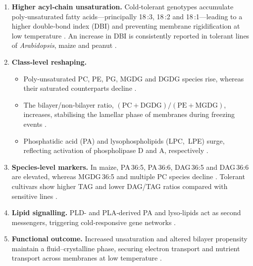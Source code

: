 \documentclass[10pt,letterpaper]{article}
\begin{document}
\begin{enumerate}[label=\textbf{\arabic*.}, leftmargin=1.2em]
  \item \textbf{Higher acyl‑chain unsaturation.}  Cold‐tolerant genotypes accumulate poly‑unsaturated fatty acids—principally 18\,:3, 18\,:2 and 18\,:1—leading to a higher double‑bond index (DBI) and preventing membrane rigidification at low temperature \citep[pp.~431–440, 460]{Low_temp_stress_Bhattacharya}.  An increase in DBI is consistently reported in tolerant lines of \textit{Arabidopsis}, maize and peanut \citep[pp.~11–12]{Lipid_transcriptome_Cold_stress_Yu}.

  \item \textbf{Class‑level reshaping.}  
        \begin{itemize}
          \item Poly‑unsaturated PC, PE, PG, MGDG and DGDG species rise, whereas their saturated counterparts decline \citep[pp.~3–4]{Low_temperatures_Wang,Low_temp_stress_Bhattacharya}.  
          \item The bilayer/non‑bilayer ratio, \(\mathrm{(PC+DGDG)/(PE+MGDG)}\), increases, stabilising the lamellar phase of membranes during freezing events \citep[pp.~492–493]{Low_temp_stress_Bhattacharya}.  
          \item Phosphatidic acid (PA) and lysophospholipids (LPC, LPE) surge, reflecting activation of phospholipase D and A, respectively \citep[pp.~456, 472--474]{Low_temp_stress_Bhattacharya}.
        \end{itemize}

  \item \textbf{Species‑level markers.}  In maize, PA\,36:5, PA\,36:6, DAG\,36:5 and DAG\,36:6 are elevated, whereas MGDG\,36:5 and multiple PC species decline \citep[pp.~6–8]{cold_tolerance_maize_Shi}.  Tolerant cultivars show higher TAG and lower DAG/TAG ratios compared with sensitive lines \citep[pp.~11]{Lipid_transcriptome_Cold_stress_Yu}.

  \item \textbf{Lipid signalling.}  PLD- and PLA‑derived PA and lyso‑lipids act as second messengers, triggering cold‐responsive gene networks \citep[pp.~454–456]{Low_temp_stress_Bhattacharya}.

  \item \textbf{Functional outcome.}  Increased unsaturation and altered bilayer propensity maintain a fluid–crystalline phase, securing electron transport and nutrient transport across membranes at low temperature \citep[pp.~463–465]{Low_temp_stress_Bhattacharya}.
\end{enumerate}
\end{document}
